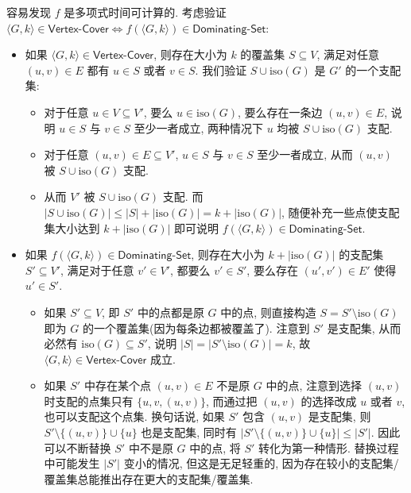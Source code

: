 \documentclass[8pt]{article}
\theoremstyle{compact}
\def\le{\leqslant}
\begin{document}
容易发现 $f$ 是多项式时间可计算的. 考虑验证 $\langle G, k \rangle \in \textsf{Vertex-Cover} \Leftrightarrow f(\langle G, k \rangle) \in \textsf{Dominating-Set}$:
\begin{itemize}
	\item 如果 $\langle G, k \rangle \in \textsf{Vertex-Cover}$, 则存在大小为 $k$ 的覆盖集 $S \subseteq V$, 满足对任意 $(u, v) \in E$ 都有 $u \in S$ 或者 $v \in S$. 我们验证 $S \cup \text{iso}(G)$ 是 $G'$ 的一个支配集:
	\begin{itemize}
		\item 对于任意 $u \in V \subseteq V'$, 要么 $u \in \text{iso}(G)$, 要么存在一条边 $(u, v) \in E$, 说明 $u \in S$ 与 $v \in S$ 至少一者成立, 两种情况下 $u$ 均被 $S \cup \text{iso}(G)$ 支配.
		\item 对于任意 $(u, v) \in E \subseteq V'$, $u \in S$ 与 $v \in S$ 至少一者成立, 从而 $(u, v)$ 被 $S \cup \text{iso}(G)$ 支配.
		\item 从而 $V'$ 被 $S \cup \text{iso}(G)$ 支配. 而 $|S \cup \text{iso}(G)| \le |S| + |\text{iso}(G)| = k + |\text{iso}(G)|$, 随便补充一些点使支配集大小达到 $k + |\text{iso}(G)|$ 即可说明 $f(\langle G, k \rangle) \in \textsf{Dominating-Set}$.
	\end{itemize}  
	\item 如果 $f(\langle G, k \rangle) \in \textsf{Dominating-Set}$, 则存在大小为 $k + |\text{iso}(G)|$ 的支配集 $S' \subseteq V'$, 满足对于任意 $v' \in V'$, 都要么 $v' \in S'$, 要么存在 $(u', v') \in E'$ 使得 $u' \in S'$.
	\begin{itemize}
		\item 如果 $S' \subseteq V$, 即 $S'$ 中的点都是原 $G$ 中的点, 则直接构造 $S = S' \setminus \text{iso}(G)$ 即为 $G$ 的一个覆盖集(因为每条边都被覆盖了). 注意到 $S'$ 是支配集, 从而必然有 $\text{iso}(G) \subseteq S'$, 说明 $|S| = |S' \setminus \text{iso}(G)| = k$, 故 $\langle G, k \rangle \in \textsf{Vertex-Cover}$ 成立.
		\item 如果 $S'$ 中存在某个点 $(u, v) \in E$ 不是原 $G$ 中的点, 注意到选择 $(u, v)$ 时支配的点集只有 $\{u, v, (u, v)\}$, 而通过把 $(u, v)$ 的选择改成 $u$ 或者 $v$, 也可以支配这个点集. 换句话说, 如果 $S'$ 包含 $(u, v)$ 是支配集, 则 $S' \setminus \{(u, v)\} \cup \{u\}$ 也是支配集, 同时有 $|S' \setminus \{(u, v)\} \cup \{u\}| \le |S'|$. 因此可以不断替换 $S'$ 中不是原 $G$ 中的点, 将 $S'$ 转化为第一种情形. 替换过程中可能发生 $|S'|$ 变小的情况, 但这是无足轻重的, 因为存在较小的支配集/覆盖集总能推出存在更大的支配集/覆盖集.
	\end{itemize}
\end{itemize}
\end{document}
